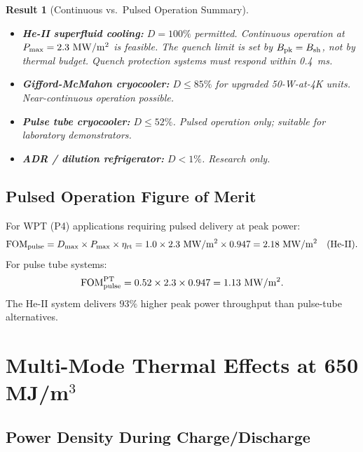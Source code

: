 \documentclass[aps,prd,twocolumn,superscriptaddress]{revtex4-2}
\newcommand{\Pmax}{P_{\rm max}}
\newtheorem{result}{Result}
\begin{document}
\begin{result}[Continuous vs.\ Pulsed Operation Summary]
\begin{itemize}
\item \textbf{He-II superfluid cooling:} $D = 100\%$ permitted. Continuous
  operation at $\Pmax = 2.3~\mathrm{MW/m^2}$ is feasible. The quench
  limit is set by $B_{\rm pk} = B_{\rm sh}$, not by thermal budget.
  Quench protection systems must respond within 0.4~ms.
\item \textbf{Gifford-McMahon cryocooler:} $D \leq 85\%$ for upgraded
  50-W-at-4K units. Near-continuous operation possible.
\item \textbf{Pulse tube cryocooler:} $D \leq 52\%$. Pulsed operation only;
  suitable for laboratory demonstrators.
\item \textbf{ADR / dilution refrigerator:} $D < 1\%$. Research only.
\end{itemize}
\end{result}

\subsection{Pulsed Operation Figure of Merit}

For WPT (P4) applications requiring pulsed delivery at peak power:
\begin{equation}
\mathrm{FOM}_{\rm pulse} = D_{\rm max}\times \Pmax \times \eta_{\rm rt}
= 1.0\times 2.3~\mathrm{MW/m^2}\times 0.947
= 2.18~\mathrm{MW/m^2}\quad\text{(He-II)}.
\end{equation}
For pulse tube systems:
\begin{equation}
\mathrm{FOM}_{\rm pulse}^{\rm PT} = 0.52\times 2.3\times 0.947
= 1.13~\mathrm{MW/m^2}.
\end{equation}
The He-II system delivers $93\%$ higher peak power throughput than
pulse-tube alternatives.

\section{Multi-Mode Thermal Effects at 650 MJ/m$^3$}
\label{sec:multimode_thermal}

\subsection{Power Density During Charge/Discharge}
\end{document}
